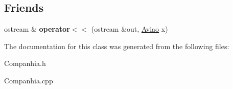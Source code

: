 \subsection*{Friends}
\begin{DoxyCompactItemize}
\item 
\hypertarget{class_aviao_a22d9ece2329fa0f6f69b73dd0cb5d19c}{
ostream \& {\bfseries operator$<$$<$} (ostream \&out, \hyperlink{class_aviao}{Aviao} x)}
\label{class_aviao_a22d9ece2329fa0f6f69b73dd0cb5d19c}

\end{DoxyCompactItemize}


The documentation for this class was generated from the following files:\begin{DoxyCompactItemize}
\item 
Companhia.h\item 
Companhia.cpp\end{DoxyCompactItemize}
